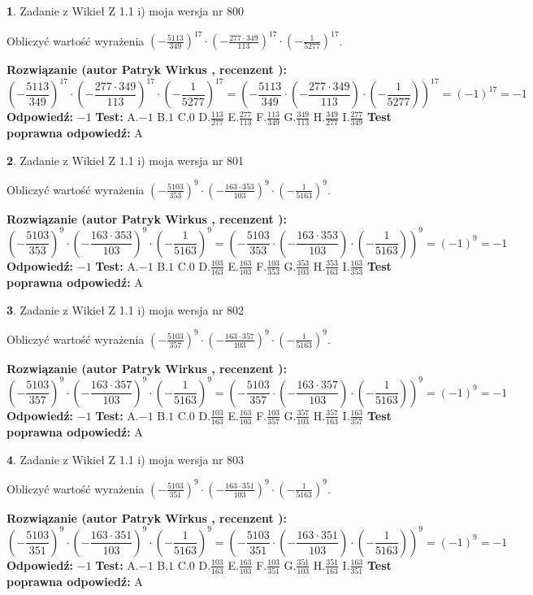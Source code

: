 \documentclass[12pt, a4paper]{article}
\theoremstyle{definition} %
\newtheorem{zad}{}
\newcommand{\zadStart}[1]{\begin{zad}#1\newline}
\newcommand{\zadStop}{\end{zad}}
\newcommand{\rozwStart}[2]{\noindent \textbf{Rozwiązanie (autor #1 , recenzent #2): }\newline}
\newcommand{\rozwStop}{\newline}
\newcommand{\odpStart}{\noindent \textbf{Odpowiedź:}\newline}
\newcommand{\odpStop}{\newline}
\newcommand{\testStart}{\noindent \textbf{Test:}\newline}
\newcommand{\testStop}{\newline}
\newcommand{\kluczStart}{\noindent \textbf{Test poprawna odpowiedź:}\newline}
\newcommand{\kluczStop}{\newline}
\begin{document}
\zadStart{Zadanie z Wikieł Z 1.1 i) moja wersja nr 800}

Obliczyć wartość wyrażenia $(-\frac{5113}{349})^{17} \cdot (-\frac{277 \cdot 349}{113})^{17} \cdot (-\frac{1}{5277})^{17}$.
\zadStop
\rozwStart{Patryk Wirkus}{}
$$(-\frac{5113}{349})^{17} \cdot (-\frac{277 \cdot 349}{113})^{17} \cdot (-\frac{1}{5277})^{17} = (-\frac{5113}{349} \cdot (-\frac{277 \cdot 349}{113}) \cdot (-\frac{1}{5277}))^{17} = (-1)^{17} = -1$$
\rozwStop
\odpStart
$-1$
\odpStop
\testStart
A.$-1$ B.$1$ C.$0$ D.$\frac{113}{277}$ E.$\frac{277}{113}$
F.$\frac{113}{349}$ G.$\frac{349}{113}$
H.$\frac{349}{277}$
I.$\frac{277}{349}$
\testStop
\kluczStart
A
\kluczStop



\zadStart{Zadanie z Wikieł Z 1.1 i) moja wersja nr 801}

Obliczyć wartość wyrażenia $(-\frac{5103}{353})^{9} \cdot (-\frac{163 \cdot 353}{103})^{9} \cdot (-\frac{1}{5163})^{9}$.
\zadStop
\rozwStart{Patryk Wirkus}{}
$$(-\frac{5103}{353})^{9} \cdot (-\frac{163 \cdot 353}{103})^{9} \cdot (-\frac{1}{5163})^{9} = (-\frac{5103}{353} \cdot (-\frac{163 \cdot 353}{103}) \cdot (-\frac{1}{5163}))^{9} = (-1)^{9} = -1$$
\rozwStop
\odpStart
$-1$
\odpStop
\testStart
A.$-1$ B.$1$ C.$0$ D.$\frac{103}{163}$ E.$\frac{163}{103}$
F.$\frac{103}{353}$ G.$\frac{353}{103}$
H.$\frac{353}{163}$
I.$\frac{163}{353}$
\testStop
\kluczStart
A
\kluczStop



\zadStart{Zadanie z Wikieł Z 1.1 i) moja wersja nr 802}

Obliczyć wartość wyrażenia $(-\frac{5103}{357})^{9} \cdot (-\frac{163 \cdot 357}{103})^{9} \cdot (-\frac{1}{5163})^{9}$.
\zadStop
\rozwStart{Patryk Wirkus}{}
$$(-\frac{5103}{357})^{9} \cdot (-\frac{163 \cdot 357}{103})^{9} \cdot (-\frac{1}{5163})^{9} = (-\frac{5103}{357} \cdot (-\frac{163 \cdot 357}{103}) \cdot (-\frac{1}{5163}))^{9} = (-1)^{9} = -1$$
\rozwStop
\odpStart
$-1$
\odpStop
\testStart
A.$-1$ B.$1$ C.$0$ D.$\frac{103}{163}$ E.$\frac{163}{103}$
F.$\frac{103}{357}$ G.$\frac{357}{103}$
H.$\frac{357}{163}$
I.$\frac{163}{357}$
\testStop
\kluczStart
A
\kluczStop



\zadStart{Zadanie z Wikieł Z 1.1 i) moja wersja nr 803}

Obliczyć wartość wyrażenia $(-\frac{5103}{351})^{9} \cdot (-\frac{163 \cdot 351}{103})^{9} \cdot (-\frac{1}{5163})^{9}$.
\zadStop
\rozwStart{Patryk Wirkus}{}
$$(-\frac{5103}{351})^{9} \cdot (-\frac{163 \cdot 351}{103})^{9} \cdot (-\frac{1}{5163})^{9} = (-\frac{5103}{351} \cdot (-\frac{163 \cdot 351}{103}) \cdot (-\frac{1}{5163}))^{9} = (-1)^{9} = -1$$
\rozwStop
\odpStart
$-1$
\odpStop
\testStart
A.$-1$ B.$1$ C.$0$ D.$\frac{103}{163}$ E.$\frac{163}{103}$
F.$\frac{103}{351}$ G.$\frac{351}{103}$
H.$\frac{351}{163}$
I.$\frac{163}{351}$
\testStop
\kluczStart
A
\kluczStop
\end{document}

